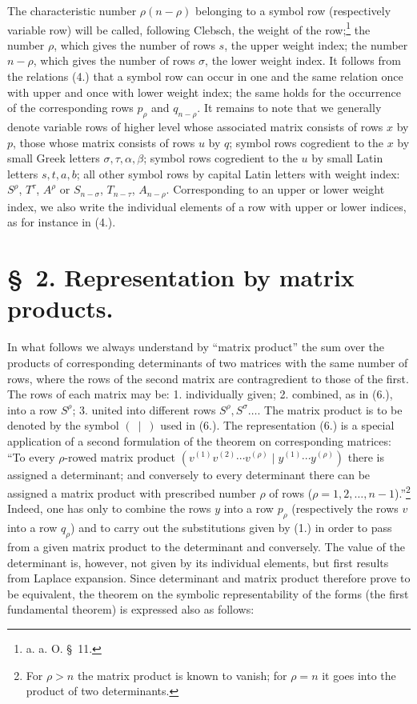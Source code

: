 \documentclass[11pt]{article}
\begin{document}
The characteristic number $\rho(n-\rho)$ belonging to a symbol row (respectively variable row) will be called, following Clebsch, the weight of the row;\footnote{a. a. O. \S\ 11.} the number $\rho$, which gives the number of rows $s$, the upper weight index; the number $n-\rho$, which gives the number of rows $\sigma$, the lower weight index. It follows from the relations (4.) that a symbol row can occur in one and the same relation once with upper and once with lower weight index; the same holds for the occurrence of the corresponding rows $p_\rho$ and $q_{n-\rho}$. It remains to note that we generally denote variable rows of higher level whose associated matrix consists of rows $x$ by $p$, those whose matrix consists of rows $u$ by $q$; symbol rows cogredient to the $x$ by small Greek letters $\sigma,\tau,\alpha,\beta$; symbol rows cogredient to the $u$ by small Latin letters $s,t,a,b$; all other symbol rows by capital Latin letters with weight index: $S^\rho$, $T^\tau$, $A^\rho$ or $S_{n-\sigma}$, $T_{n-\tau}$, $A_{n-\rho}$. Corresponding to an upper or lower weight index, we also write the individual elements of a row with upper or lower indices, as for instance in (4.).

\section*{\S\ 2. Representation by matrix products.}
In what follows we always understand by ``matrix product'' the sum over the products of corresponding determinants of two matrices with the same number of rows, where the rows of the second matrix are contragredient to those of the first. The rows of each matrix may be: 1. individually given; 2. combined, as in (6.), into a row $S^\rho$; 3. united into different rows $S^\rho,S^\sigma\ldots$. The matrix product is to be denoted by the symbol $(\ \mid\ )$ used in (6.). The representation (6.) is a special application of a second formulation of the theorem on corresponding matrices: ``To every $\rho$-rowed matrix product $(v^{(1)}v^{(2)}\cdots v^{(\rho)}\mid y^{(1)}\cdots y^{(\rho)})$ there is assigned a determinant; and conversely to every determinant there can be assigned a matrix product with prescribed number $\rho$ of rows ($\rho=1,2,\ldots,n-1$).''\footnote{For $\rho>n$ the matrix product is known to vanish; for $\rho=n$ it goes into the product of two determinants.} Indeed, one has only to combine the rows $y$ into a row $p_\rho$ (respectively the rows $v$ into a row $q_\rho$) and to carry out the substitutions given by (1.) in order to pass from a given matrix product to the determinant and conversely. The value of the determinant is, however, not given by its individual elements, but first results from Laplace expansion. Since determinant and matrix product therefore prove to be equivalent, the theorem on the symbolic representability of the forms (the first fundamental theorem) is expressed also as follows:
\end{document}

